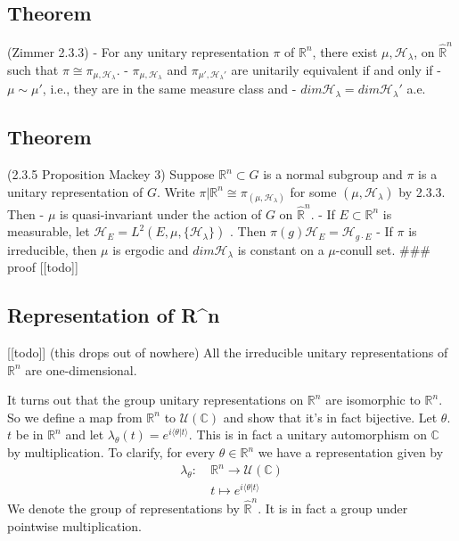 \documentclass[
]{article}
\begin{document}
\hypertarget{theorem}{%
\subsection{Theorem}\label{theorem}}

(Zimmer 2.3.3) - For any unitary representation \(\pi\) of
\(\mathbb{R}^n\), there exist \(\mu, \mathscr{H}_{\lambda}\), on
\(\hat{\mathbb{R}}^n\) such that
\(\pi \cong \pi_{\mu, \mathscr{H}_{\lambda}}\). -
\(\pi_{\mu, \mathscr{H}_{\lambda}}\) and
\(\pi_{\mu', \mathscr{H}_{\lambda}'}\) are unitarily equivalent if and
only if - \(\mu \sim \mu'\), i.e., they are in the same measure class
and - \(dim\mathscr{H}_{\lambda} = dim \mathscr{H}_{\lambda}'\) a.e.

\hypertarget{theorem-1}{%
\subsection{Theorem}\label{theorem-1}}

(2.3.5 Proposition Mackey 3) Suppose \(\mathbb{R}^n \subset G\) is a
normal subgroup and \(\pi\) is a unitary representation of \(G\). Write
\(\pi | \mathbb{R}^n \cong \pi_{(\mu, \mathscr{H}_{\lambda})}\) for some
\((\mu, \mathscr{H}_{\lambda})\) by 2.3.3. Then - \(\mu\) is
quasi-invariant under the action of \(G\) on \(\hat{\mathbb{R}}^n\). -
If \(E \subset \mathbb{R}^n\) is measurable, let
\(\mathscr{H}_E = L^2(E, \mu, \{\mathscr{H}_{\lambda}\})\) . Then
\(\pi(g)\mathscr{H}_E = \mathscr{H}_{g \cdot E}\) - If \(\pi\) is
irreducible, then \(\mu\) is ergodic and \(dim\mathscr{H}_{\lambda}\) is
constant on a \(\mu\)-conull set. \#\#\# proof {[}{[}todo{]}{]}

\hypertarget{representation-of-rn}{%
\subsection{Representation of R\^{}n}\label{representation-of-rn}}

{[}{[}todo{]}{]} (this drops out of nowhere) All the irreducible unitary
representations of \(\mathbb{R}^n\) are one-dimensional.

It turns out that the group unitary representations on \(\mathbb{R}^n\)
are isomorphic to \(\mathbb{R}^n\). So we define a map from
\(\mathbb{R}^n\) to \(\mathcal{U}(\mathbb{C})\) and show that it's in
fact bijective. Let \(\theta\). \(t\) be in \(\mathbb{R}^n\) and let
\(\lambda_{\theta}(t) = e^{i\langle \theta | t \rangle}\). This is in
fact a unitary automorphism on \(\mathbb{C}\) by multiplication. To
clarify, for every \(\theta \in \mathbb{R}^n\) we have a representation
given by \[
\begin{align*}
\lambda_{\theta}:\ & \mathbb{R}^n \rightarrow \mathcal{U}(\mathbb{C}) \\
& t \mapsto e^{i \langle \theta | t \rangle}
\end{align*}
\] We denote the group of representations by \(\hat{\mathbb{R}}^n\). It
is in fact a group under pointwise multiplication.
\end{document}

